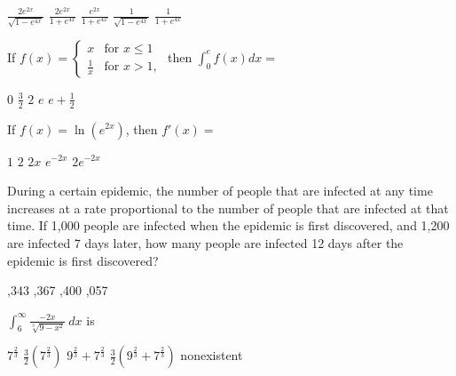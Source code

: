 \begin{questions}
    \begin{oneparchoices}
    \choice $\frac{2e^{2x}}{\sqrt{1 - e^{4x}}}$
    \CorrectChoice $\frac{2e^{2x}}{1 + e^{4x}}$
    \choice $\frac{e^{2x}}{1 + e^{4x}}$
    \choice $\frac{1}{\sqrt{1 - e^{4x}}}$
    \choice $\frac{1}{1 + e^{4x}}$
    \end{oneparchoices}

\question[2] If $f(x) = \left\{ \begin{array}{lr} x & \mbox{for } x \le
    1 \\ \frac{1}{x} & \mbox{for } x > 1, \end{array} \right.$ then $\int_0^e
    f(x)dx = $

    \begin{oneparchoices}
    \choice $0$
    \CorrectChoice $\frac{3}{2}$
    \choice $2$
    \choice $e$
    \choice $e + \frac{1}{2}$
    \end{oneparchoices}

\question[2] If $f(x) = \ln(e^{2x})$, then $f'(x) = $

    \begin{oneparchoices}
    \choice $1$
    \CorrectChoice $2$
    \choice $2x$
    \choice $e^{-2x}$
    \choice $2e^{-2x}$
    \end{oneparchoices}

\question[2] During a certain epidemic, the number of people that are
    infected at any time increases at a rate proportional to the
    number of people that are infected at that time. If 1,000 people
    are infected when the epidemic is first discovered, and 1,200 are
    infected 7 days later, how many people are infected 12 days after
    the epidemic is first discovered?

    \begin{oneparchoices}
    ,343
    ,367
    ,400
    ,057
    \end{oneparchoices}

\question[2] $\int_6^\infty \frac{-2x}{\sqrt[3]{9 - x^2}}\ dx$ is

    \begin{oneparchoices}
    \choice $7^\frac{2}{3}$
    \choice $\frac{3}{2}(7^\frac{2}{3})$
    \choice $9^\frac{2}{3} + 7^\frac{2}{3}$
    \choice $\frac{3}{2}(9^\frac{2}{3} + 7^\frac{2}{3})$
    \CorrectChoice nonexistent
    \end{oneparchoices}



\end{questions}
